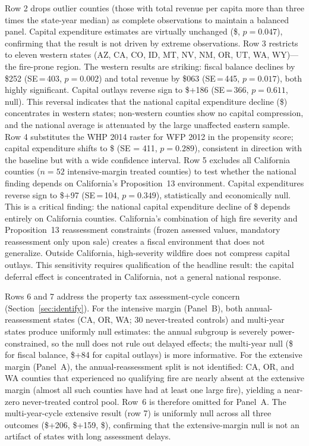 \documentclass[12pt]{article}
\begin{document}
Row 2 drops outlier counties (those with total revenue per capita more than
three times the state-year median) as complete observations to maintain a
balanced panel. Capital expenditure estimates are virtually unchanged (\$,
$p = 0.047$), confirming that the result is not driven by extreme observations.
Row 3 restricts to eleven western states (AZ, CA, CO, ID, MT, NV, NM, OR, UT, WA,
WY)---the fire-prone region. The western results are striking: fiscal balance declines
by \$252 (SE\,=\,403, $p = 0.002$) and total revenue by \$063
(SE\,=\,445, $p = 0.017$), both highly significant. Capital outlays reverse sign to
\$+186 (SE\,=\,366, $p = 0.611$, null). This reversal indicates that the national capital expenditure decline (\$)
concentrates in western states; non-western counties show no capital compression,
and the national average is attenuated by the large unaffected eastern sample.
Row 4 substitutes the WHP 2014 raster for WFP 2012 in the propensity score;
capital expenditure shifts to \$ (SE = 411, $p = 0.289$), consistent in
direction with the baseline but with a wide confidence interval.
Row 5 excludes all California counties ($n = 52$ intensive-margin treated counties)
to test whether the national finding depends on California's Proposition~13
environment. Capital expenditures reverse sign to \$+97 (SE\,=\,104, $p = 0.349$),
statistically and economically null. This is a critical finding: the national capital
expenditure decline of \$ depends entirely on California counties. California's
combination of high fire severity and Proposition~13 reassessment constraints
(frozen assessed values, mandatory reassessment only upon sale) creates a fiscal
environment that does not generalize. Outside California, high-severity wildfire does
not compress capital outlays. This sensitivity requires qualification of the headline
result: the capital deferral effect is concentrated in California, not a general
national response.

Rows 6 and 7 address the property tax assessment-cycle concern
(Section~\ref{sec:identify}). For the intensive margin (Panel~B), both
annual-reassessment states (CA, OR, WA; 30 never-treated controls) and multi-year
states produce uniformly null estimates: the annual subgroup is severely
power-constrained, so the null does not rule out delayed effects; the multi-year null
(\$ for fiscal balance, \$+84 for capital outlays) is more informative.
For the extensive margin (Panel~A), the annual-reassessment split is not identified:
CA, OR, and WA counties that experienced no qualifying fire are nearly absent at
the extensive margin (almost all such counties have had at least one large fire),
yielding a near-zero never-treated control pool. Row~6 is therefore omitted for
Panel~A. The multi-year-cycle extensive result (row 7) is uniformly null across all
three outcomes (\$+206, \$+159, \$), confirming that the extensive-margin null
is not an artifact of states with long assessment delays.
\end{document}
